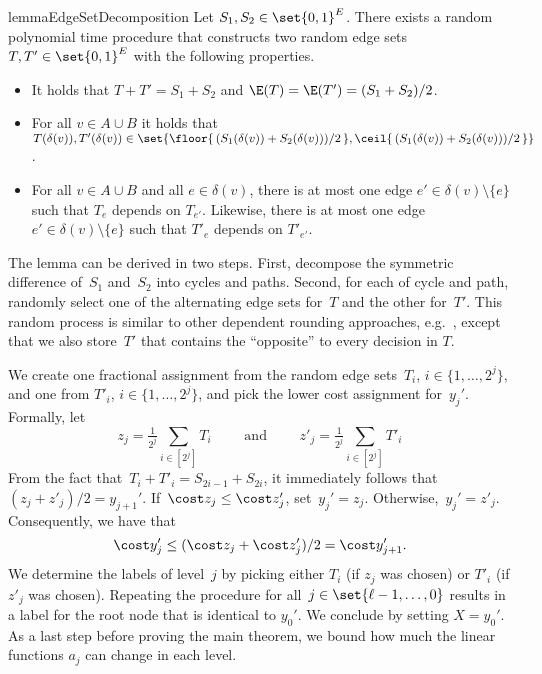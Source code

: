 \documentclass[a4paper,USenglish,cleveref,thm-restate]{lipics-v2021}
\begin{document}
\begin{restatable}{lemma}{EdgeSetDecomposition}
    \label{lem:decomposition}
    Let $S_1, S_2 \in \set{0,1}^E$.
    There exists a random polynomial time procedure that constructs two random edge sets $T, T' \in \set{0,1}^E$ with the following properties. 
    \begin{itemize}
        \item It holds that $T + T' = S_1 + S_2$ and $\E(T) = \E(T') = (S_1+S_2)/2$.
        \item For all $v \in A\cup B$ it holds that $T(\delta(v)), T'(\delta(v)) \in \set{\floor{\,(S_1(\delta(v)) + S_2(\delta(v)))/2 \,}, \ceil{\,(S_1(\delta(v)) + S_2(\delta(v)))/2 \,}}$.
        \item For all $v \in A\cup B$ and all $e \in \delta(v)$, there is at most one edge $e' \in \delta(v)\setminus\{e\}$ such that $T_e$ depends on $T_{e'}$. Likewise, there is at most one edge $e' \in \delta(v)\setminus\{e\}$ such that $T'_e$ depends on $T'_{e'}$. 
    \end{itemize}
\end{restatable}
\medskip
\noindent The lemma can be derived in two steps. First, decompose the symmetric difference of~$S_1$ and~$S_2$ into cycles and paths.
Second, for each of cycle and path, randomly select one of the alternating edge sets for~$T$ and the other for~$T'$.
This random process is similar to other dependent rounding approaches, e.g.~\cite{ChekuriVZ10,GandhiKPS06}, except that we also store~$T'$ that contains the ``opposite'' to every decision in $T$.

We create one fractional assignment from the random edge sets~$T_{i}$, $i\in\{1,\dotsc,2^j\}$,
and one from $T'_{i}$, $i\in\{1,\dotsc,2^j\}$, and pick the lower cost assignment for~$y_{j}'$.
Formally, let 
\begin{equation*}
    z_{j} = \tfrac{1}{2^{j}} \sum_{i \in [2^j]} T_{i} \qquad \text{ and } \qquad
    z'_{j} = \tfrac{1}{2^{j}} \sum_{i \in [2^j]} T'_{i} 
\end{equation*}
From the fact that~$T_{i} + T'_{i} = S_{2i-1} + S_{2i}$, it immediately follows that $(z_{j} + z'_{j})/2 = y_{j+1}'$.
If~$\cost z_j \le \cost z'_j$, set~$y_{j}' = z_{j}$. Otherwise,~$y_{j}' = z'_{j}$.
Consequently, we have that
\begin{equation}
    \label{eq:rdr-cost-of-level-j-assignment}
    \cost y_{j}' \le (\cost z_{j} + \cost z'_{j})/2 = \cost y_{j+1}'.
\end{equation}
We determine the labels of level~$j$ by picking either $T_i$ (if $z_j$ was chosen) or $T'_i$ (if $z'_j$ was chosen).
Repeating the procedure for all~$j \in \set{\ell-1,\dotsc,0}$
results in a label for the root node that is identical to $y_0'$. We conclude by setting $X = y_0'$.
As a last step before proving the main theorem, we 
bound how much the linear functions $a_j$ can change in each level.
\end{document}
